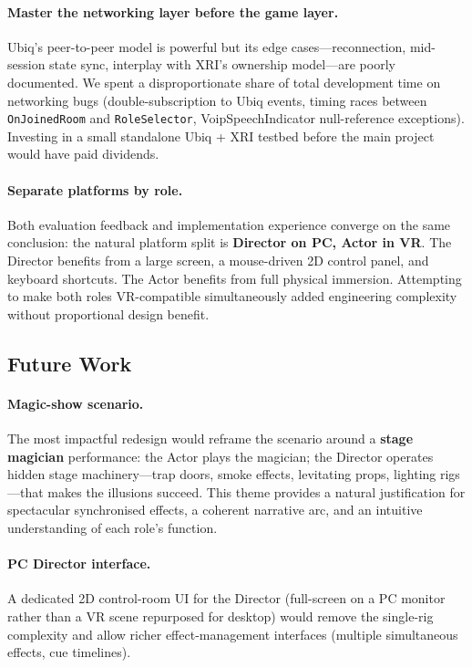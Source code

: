 \documentclass[12pt,a4paper]{article}
\newcommand{\code}[1]{\texttt{#1}}
\begin{document}
\paragraph{Master the networking layer before the game layer.}
Ubiq's peer-to-peer model is powerful but its edge cases---reconnection, mid-session state sync, interplay with XRI's ownership model---are poorly documented. We spent a disproportionate share of total development time on networking bugs (double-subscription to Ubiq events, timing races between \code{OnJoinedRoom} and \code{RoleSelector}, VoipSpeechIndicator null-reference exceptions). Investing in a small standalone Ubiq + XRI testbed before the main project would have paid dividends.

\paragraph{Separate platforms by role.}
Both evaluation feedback and implementation experience converge on the same conclusion: the natural platform split is \textbf{Director on PC, Actor in VR}. The Director benefits from a large screen, a mouse-driven 2D control panel, and keyboard shortcuts. The Actor benefits from full physical immersion. Attempting to make both roles VR-compatible simultaneously added engineering complexity without proportional design benefit.

\subsection{Future Work}

\paragraph{Magic-show scenario.}
The most impactful redesign would reframe the scenario around a \textbf{stage magician} performance: the Actor plays the magician; the Director operates hidden stage machinery---trap doors, smoke effects, levitating props, lighting rigs---that makes the illusions succeed. This theme provides a natural justification for spectacular synchronised effects, a coherent narrative arc, and an intuitive understanding of each role's function.

\paragraph{PC Director interface.}
A dedicated 2D control-room UI for the Director (full-screen on a PC monitor rather than a VR scene repurposed for desktop) would remove the single-rig complexity and allow richer effect-management interfaces (multiple simultaneous effects, cue timelines).
\end{document}
